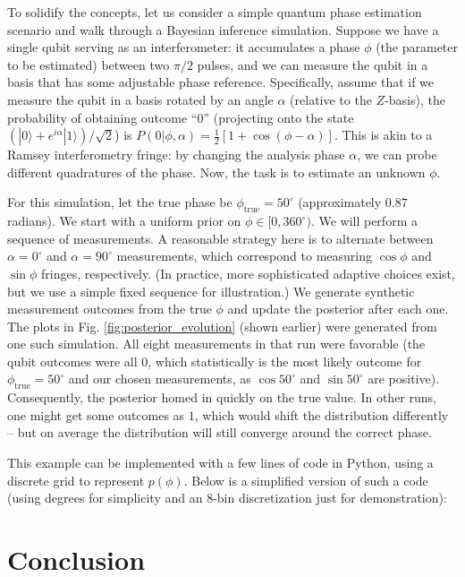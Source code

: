 To solidify the concepts, let us consider a simple quantum phase
estimation scenario and walk through a Bayesian inference
simulation. Suppose we have a single qubit serving as an
interferometer: it accumulates a phase $\phi$ (the parameter to be
estimated) between two $\pi/2$ pulses, and we can measure the qubit in
a basis that has some adjustable phase reference. Specifically, assume
that if we measure the qubit in a basis rotated by an angle $\alpha$
(relative to the $Z$-basis), the probability of obtaining outcome
“$0$” (projecting onto the state $(|0\rangle +
e^{i\alpha}|1\rangle)/\sqrt{2}$) is $P(0|\phi,\alpha) = \frac{1}{2}[1
  + \cos(\phi - \alpha)]$. This is akin to a Ramsey interferometry
fringe: by changing the analysis phase $\alpha$, we can probe
different quadratures of the phase. Now, the task is to estimate an
unknown $\phi$.



For this simulation, let the true phase be $\phi_{\text{true}} =
50^\circ$ (approximately $0.87$ radians). We start with a uniform
prior on $\phi \in [0,360^\circ)$. We will perform a sequence of
  measurements. A reasonable strategy here is to alternate between
  $\alpha=0^\circ$ and $\alpha=90^\circ$ measurements, which
  correspond to measuring $\cos\phi$ and $\sin\phi$ fringes,
  respectively. (In practice, more sophisticated adaptive choices
  exist, but we use a simple fixed sequence for illustration.) We
  generate synthetic measurement outcomes from the true $\phi$ and
  update the posterior after each one. The plots in
  Fig. \ref{fig:posterior_evolution} (shown earlier) were generated
  from one such simulation. All eight measurements in that run were
  favorable (the qubit outcomes were all $0$, which statistically is
  the most likely outcome for $\phi_{\text{true}}=50^\circ$ and our
  chosen measurements, as $\cos 50^\circ$ and $\sin 50^\circ$ are
  positive). Consequently, the posterior homed in quickly on the true
  value. In other runs, one might get some outcomes as $1$, which
  would shift the distribution differently – but on average the
  distribution will still converge around the correct phase.



This example can be implemented with a few lines of code in Python,
using a discrete grid to represent $p(\phi)$. Below is a simplified
version of such a code (using degrees for simplicity and an 8-bin
discretization just for demonstration):


\section{Conclusion}
